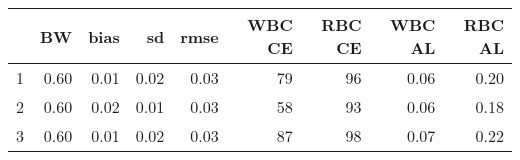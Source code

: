 \begin{table}[ht]
\centering
\begin{tabular}{rrrrrrrrr}
  \hline
 & BW & bias & sd & rmse & WBC CE & RBC CE & WBC AL & RBC AL \\
  \hline
1 & 0.60 & 0.01 & 0.02 & 0.03 & 79 & 96 & 0.06 & 0.20 \\
  2 & 0.60 & 0.02 & 0.01 & 0.03 & 58 & 93 & 0.06 & 0.18 \\
  3 & 0.60 & 0.01 & 0.02 & 0.03 & 87 & 98 & 0.07 & 0.22 \\
   \hline
\end{tabular}
\end{table}
